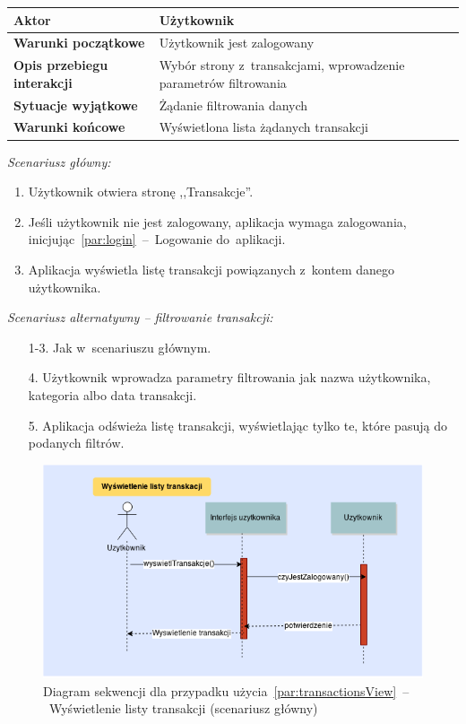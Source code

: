 \begin{longtable}{|p{5cm}|p{7cm}|}
  \hline \textbf{Aktor} & Użytkownik \\
  \hline \textbf{Warunki początkowe} & Użytkownik jest zalogowany \\
  \hline \textbf{Opis przebiegu interakcji} & Wybór strony z~transakcjami, wprowadzenie parametrów filtrowania \\
  \hline \textbf{Sytuacje wyjątkowe} & Żądanie filtrowania danych \\
  \hline \textbf{Warunki końcowe} & Wyświetlona lista żądanych transakcji \\
  \hline
\end{longtable}

\noindent \textit{Scenariusz główny:}
\begin{enumerate}
  \item Użytkownik otwiera stronę ,,Transakcje''.
  \item Jeśli użytkownik nie jest zalogowany, aplikacja wymaga zalogowania, inicjując~\ref{par:login}~--~Logowanie do~aplikacji.
  \item Aplikacja wyświetla listę transakcji powiązanych z~kontem danego użytkownika.
\end{enumerate}

\noindent \textit{Scenariusz alternatywny -- filtrowanie transakcji:}
\begin{enumerate}
  \item[1-3.] Jak w~scenariuszu głównym.
  \item[4.] Użytkownik wprowadza parametry filtrowania jak nazwa użytkownika, kategoria albo data transakcji.
  \item[5.] Aplikacja odświeża listę transakcji, wyświetlając tylko te, które pasują do podanych filtrów.
\end{enumerate}

\begin{figure}[H]
  \includegraphics[width=\textwidth]{images/wyswietl_transakcje.png}
  \caption{Diagram sekwencji dla przypadku użycia~\ref{par:transactionsView}~--~Wyświetlenie listy transakcji (scenariusz główny)}
\end{figure}

